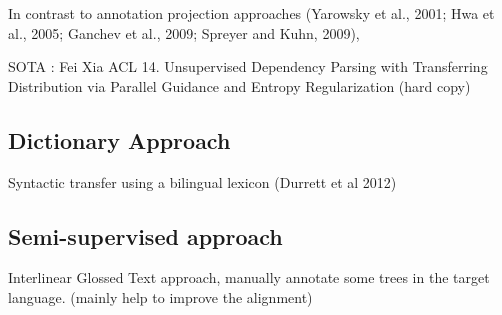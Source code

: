 In contrast to annotation projection approaches (Yarowsky et al.,
2001; Hwa et al., 2005; Ganchev et al., 2009; Spreyer
and Kuhn, 2009), 

SOTA : Fei Xia ACL 14. Unsupervised Dependency Parsing with Transferring Distribution via Parallel Guidance and Entropy Regularization (hard copy)
\subsection{Dictionary Approach}
Syntactic transfer using a bilingual lexicon (Durrett et al 2012)

\subsection{Semi-supervised approach}

Interlinear Glossed Text approach, manually annotate some trees in the target language. (mainly help to improve the alignment)
